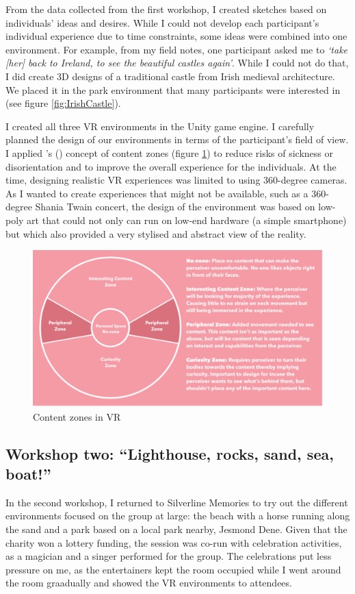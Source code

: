 From the data collected from the first workshop, I created sketches based on individuals' ideas and desires. While I could not develop each participant's individual experience due to time constraints, some ideas were combined into one environment. For example, from my field notes, one participant asked me to \textit{`take [her] back to Ireland, to see the beautiful castles again’}. While I could not do that, I did create 3D designs of a traditional castle from Irish medieval architecture. We placed it in the park environment that many participants were interested in (see figure \ref{fig:IrishCastle}).

I created all three VR environments in the Unity game engine. I carefully planned the design of our environments in terms of the participant's field of view. I applied \citeauthor{alger_visual_2015}'s (\citeyear{alger_visual_2015}) concept of content zones (figure \ref{fig:ContentZone}) to reduce risks of sickness or disorientation and to improve the overall experience for the individuals. At the time, designing realistic VR experiences was limited to using 360-degree cameras. As I wanted to create experiences that might not be available, such as a 360-degree Shania Twain concert, the design of the environment was based on low-poly art that could not only can run on low-end hardware (a simple smartphone) but which also provided a very stylised and abstract view of the reality.

\begin{figure}[htp]
\centering
\includegraphics[width=.8\linewidth]{Images/ChapterFour/ContentZones.png}
\caption{Content zones in VR}
\label{fig:ContentZone}
\end{figure}

\subsection{Workshop two: ``Lighthouse, rocks, sand, sea, boat!''}
\label{StudyOne:WorkshopTwo}
In the second workshop, I returned to Silverline Memories to try out the different environments focused on the group at large: the beach with a horse running along the sand and a park based on a local park nearby, Jesmond Dene. Given that the charity won a lottery funding, the session was co-run with celebration activities, as a magician and a singer performed for the group. The celebrations put less pressure on me, as the entertainers kept the room occupied while I went around the room graadually and showed the VR environments to attendees. 

